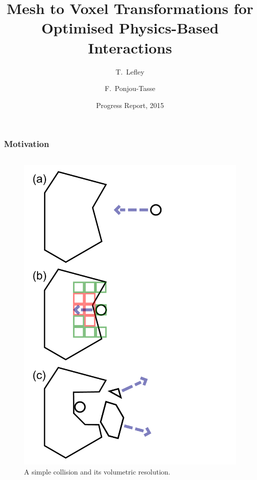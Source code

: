 \documentclass{beamer}
\begin{document}
	\title[Crisis] %
	{Mesh to Voxel Transformations for Optimised Physics-Based Interactions}
	\subtitle{}
	\author[Lefley, Ponjou-Tasse] %
	{T.~Lefley \and F.~Ponjou-Tasse}

	\date[2015] %
	{Progress Report, 2015}
	\subject{Computer Science}

	\frame{\titlepage}

	\begin{frame}
	\frametitle{Motivation}
		\begin{columns}[T] %
			\begin{column}[T]{5cm} %
				\begin{figure}
					\centerline{\includegraphics[scale=0.2]{diagram.pdf}}
					\caption{A simple collision and its volumetric resolution.}

\end{figure}
\end{column}
\end{columns}
\end{frame}
\end{document}

